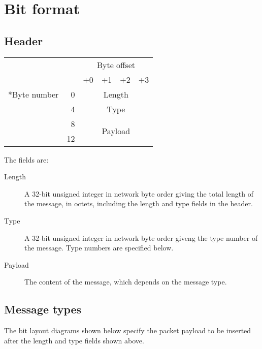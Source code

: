 \documentclass[a4paper,12pt]{report}
\begin{document}
\section{Bit format}
\subsection{Header}
\begin{center}
\begin{tabular}{r r | c | c | c | c |}
 & & \multicolumn{4}{c}{Byte offset} \\
 & & +0 & +1 & +2 & +3 \\
\hhline{~-----}
\multirow{4}*{Byte number} & 0 & \multicolumn{4}{c|}{Length} \\
\hhline{~~----}
 & 4 & \multicolumn{4}{c|}{Type} \\
\hhline{~~----}
 & 8 & \multicolumn{4}{c|}{\multirow{2}{*}{Payload}} \\
 & 12 & \multicolumn{4}{c|}{} \\
\end{tabular}
\end{center}

The fields are:
\begin{description}
\item[Length]  A 32-bit unsigned integer in network byte order giving the total length of the message, in octets, including the length and type fields in the header.
\item[Type]  A 32-bit unsigned integer in network byte order giveng the type number of the message.  Type numbers are specified below.
\item[Payload]  The content of the message, which depends on the message type.
\end{description}

\subsection{Message types}
The bit layout diagrams shown below specify the packet payload to be inserted after the length and type fields shown above.
\end{document}
